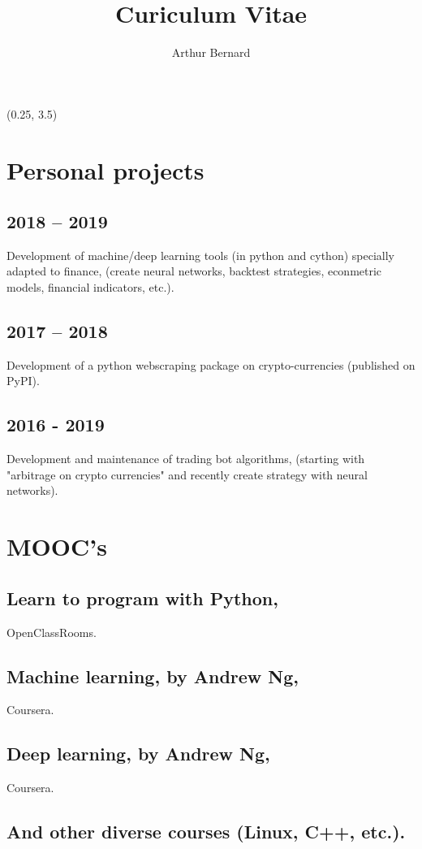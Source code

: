 \documentclass[a4paper,11pt]{arthur-cv}
\title{Curiculum Vitae}
\author{Arthur Bernard}
\begin{document}
\makeprofile %

\begin{textblock}{20.5}(0.25, 3.5)

  \begin{minipage}[t]{0.38\textwidth}%
  
    \section{Personal projects}
      \subsection{2018 – 2019}{Development of  machine/deep learning  tools (in python and cython) specially adapted to finance, (create neural networks, backtest strategies, econmetric models, financial indicators, etc.).}
      \subsection{2017 – 2018}{Development of a python webscraping package on crypto-currencies (published on PyPI).}
      \subsection{2016 - 2019}{Development and maintenance of trading bot algorithms, (starting with "arbitrage on crypto currencies" and recently create strategy with neural networks).}

    \section{MOOC's}
      \subsection{Learn to program with Python,}{OpenClassRooms.}
      \subsection{Machine learning, by Andrew Ng,}{Coursera.}
      \subsection{Deep learning, by Andrew Ng,}{Coursera.}
      \subsection{And other diverse courses (Linux, C++, etc.).}


\end{minipage}
\end{textblock}
\end{document}
